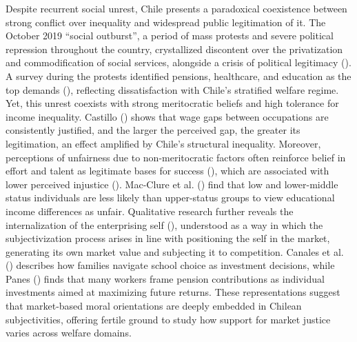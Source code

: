\documentclass[
  13pt,
]{article}
\begin{document}
Despite recurrent social unrest, Chile presents a paradoxical
coexistence between strong conflict over inequality and widespread
public legitimation of it. The October 2019 ``social outburst'', a
period of mass protests and severe political repression throughout the
country, crystallized discontent over the privatization and
commodification of social services, alongside a crisis of political
legitimacy (). A survey
during the protests identified pensions, healthcare, and education as
the top demands
(), reflecting dissatisfaction with Chile's
stratified welfare regime. Yet, this unrest coexists with strong
meritocratic beliefs and high tolerance for income inequality. Castillo
() shows that wage gaps
between occupations are consistently justified, and the larger the
perceived gap, the greater its legitimation, an effect amplified by
Chile's structural inequality. Moreover, perceptions of unfairness due
to non-meritocratic factors often reinforce belief in effort and talent
as legitimate bases for success
(),
which are associated with lower perceived injustice
().
Mac-Clure et al. () find that low and lower-middle status individuals are less
likely than upper-status groups to view educational income differences
as unfair. Qualitative research further reveals the internalization of
the enterprising self (),
understood as a way in which the subjectivization process arises in line
with positioning the self in the market, generating its own market value
and subjecting it to competition. Canales et al.
() describes how families
navigate school choice as investment decisions, while Panes
() finds that many workers frame
pension contributions as individual investments aimed at maximizing
future returns. These representations suggest that market-based moral
orientations are deeply embedded in Chilean subjectivities, offering
fertile ground to study how support for market justice varies across
welfare domains.
\end{document}
